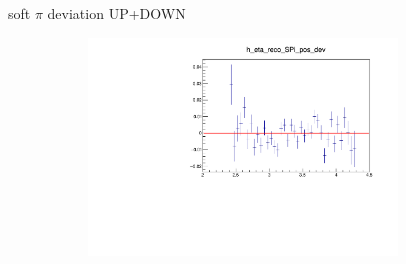 \documentclass[11pt]{beamer}
\begin{document}
\begin{frame}{soft $\pi$ deviation UP+DOWN}
\begin{figure}
\begin{subfigure}{0.45\textwidth}
\end{subfigure}
\begin{subfigure}{0.45\textwidth}
\includegraphics[width=0.9\textwidth]{first/up_plus_down_pdf/eta_2.pdf}
\end{subfigure}
\end{figure}
\end{frame}
\end{document}
